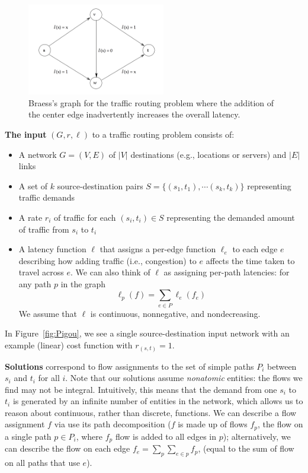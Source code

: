 \begin{figure}[ht!]
    \centering
    \includegraphics[height=4cm]{braess.png}
    \caption{Braess's graph for the traffic routing problem where the addition of the center edge inadvertently increases the overall latency.}
    \label{fig:braess}
\end{figure}

\medskip\noindent
\textbf{The input} $(G,r,\ell)$ to a traffic routing problem consists of:
\begin{itemize}
    \item A network $G = (V, E)$ of $|V|$ destinations (e.g., locations or servers) and $|E|$ links 
     \item A set of $k$ source-destination pairs $S=\{(s_1,t_1), \cdots (s_k,t_k)\}$ representing traffic demands
    \item A {rate} $r_i$ of traffic for each $(s_i,t_i)\in S$ representing the demanded amount of traffic from $s_i$ to $t_i$
    \item A {latency} function $\ell$ that assigns a per-edge function $\ell_e$ to each edge $e$ describing how adding traffic (i.e., congestion) to $e$ affects the time taken to travel across $e$. We can also think of $\ell$ as assigning per-path latencies: for any path $p$ in the graph
        $$\ell_p(f) = \sum_{e\in P}\ell_e(f_e)$$ 
        We assume that $\ell$ is continuous, nonnegative, and nondecreasing.
\end{itemize}
In Figure~\ref{fig:Pigou}, we see a single source-destination input network with an example (linear) cost function with $r_{(s,t)} = 1$.

\medskip\noindent
\textbf{Solutions} correspond to flow assignments to the set of simple paths $P_i$ between $s_i$ and $t_i$ for all $i$. Note that our solutions assume \emph{nonatomic} entities: the flows we find may not be integral.
Intuitively, this means that the demand from one $s_i$ to $t_i$ is generated by an infinite number
of entities in the network, which allows us to reason about continuous, rather than discrete, functions.
%
We can describe a flow assignment $f$ via use its path decomposition ($f$ is made up of flows $f_p$, the flow on a single path $p \in P_i$, where $f_p$ flow is added to all edges in $p$); alternatively, we can describe the flow on each edge $f_e = \sum_p \sum_{e\in p} f_p$, (equal to the sum of flow on all paths that use $e$).

